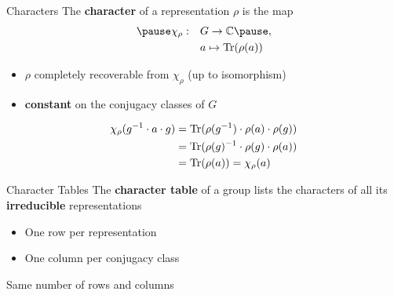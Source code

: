 \begin{frame}{Characters}
    \large
    The \textbf{character} of a representation $\rho$ is the map
    \Large
    \begin{align*}
        \pause
        \chi_\rho: \quad & G \to \C \pause , \\
        & a \mapsto \Tr(\rho(a))
    \end{align*}
    
    \pause
    \large
    \begin{itemize}
        \item $\rho$ completely recoverable from $\chi_\rho$ (up to isomorphism) \pause
        \item \textbf{constant} on the conjugacy classes of $G$
    \end{itemize}
    \begin{align*}
        \chi_\rho(g^{-1} \cdot a \cdot g)
        & = \operatorname{Tr}(\rho(g^{-1}) \cdot \rho(a) \cdot \rho(g)) \\
        & = \operatorname{Tr}(\rho(g)^{-1} \cdot \rho(g) \cdot \rho(a)) \\
        & = \operatorname{Tr}(\rho(a)) = \chi_\rho(a)
    \end{align*}

    \normalsize
    {\hspace*{\fill} \cite{fulton2013}}
    
\end{frame}

\begin{frame}{Character Tables}
    \large
    The \textbf{character table} of a group lists the characters of all its \textbf{irreducible} representations
    
    \pause
    \vspace{1em}
    \begin{itemize}
        \item One row per representation \pause
        \item One column per conjugacy class
    \end{itemize}
    
    \vspace{1em}
    \pause
    Same number of rows and columns

    \vspace{1em}
    \normalsize
    {\hspace*{\fill} \cite{fulton2013}}

\end{frame}
